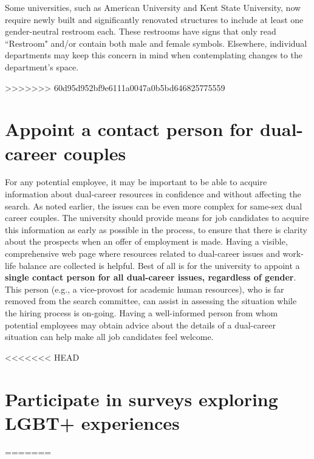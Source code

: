Some universities, such as American University and Kent State University, now require newly built and significantly renovated structures to include at least one gender-neutral restroom each. These restrooms have signs that only read ``Restroom" and/or contain both male and female symbols. Elsewhere, individual departments may keep this concern in mind when contemplating changes to the department's space.

>>>>>>> 60d95d952bf9e6111a0047a0b5bd646825775559
\section {Appoint a contact person for dual-career couples}
\label{dual-career-contact}
For any potential employee, it may be important to be able to acquire information about dual-career resources in confidence and without affecting the search.  As noted earlier, the issues can be even more complex for same-sex dual career couples. The university should provide means for job candidates to acquire this information as early as possible in the process, to ensure that there is clarity about the prospects when an offer of employment is made.  Having a visible, comprehensive web page where resources related to dual-career issues and work-life balance are collected is helpful.  Best of all is for the university to appoint a \textbf{single contact person for all dual-career issues, regardless of gender}. This person (e.g., a vice-provost for academic human resources), who is far removed from the search committee, can assist in assessing the situation while the hiring process is on-going.  Having a well-informed person from whom potential employees may obtain advice about the details of a dual-career situation can help make all job candidates feel welcome.


<<<<<<< HEAD
\section {Participate in surveys exploring LGBT+ experiences}
=======

